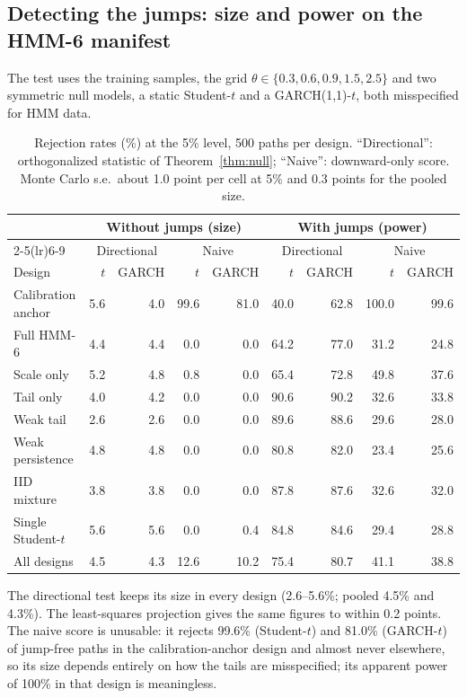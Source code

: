\documentclass[11pt,a4paper]{article}
\theoremstyle{definition}
\theoremstyle{remark}
\begin{document}
\subsection{Detecting the jumps: size and power on the HMM-6 manifest}\label{sec:full}
The test uses the training samples, the grid $\theta\in\{0.3,0.6,0.9,1.5,2.5\}$ and two symmetric null models, a static Student-$t$ and a GARCH(1,1)-$t$, both misspecified for HMM data.

\begin{table}[ht]\centering\footnotesize\setlength{\tabcolsep}{4pt}
\caption{Rejection rates (\%) at the 5\% level, 500 paths per design. ``Directional'': orthogonalized statistic of Theorem~\ref{thm:null}; ``Naive'': downward-only score. Monte Carlo s.e.\ about 1.0 point per cell at 5\% and 0.3 points for the pooled size.}\label{tab:full}
\begin{tabular}{l rr rr rr rr}
\toprule
 & \multicolumn{4}{c}{Without jumps (size)} & \multicolumn{4}{c}{With jumps (power)}\\
\cmidrule(lr){2-5}\cmidrule(lr){6-9}
 & \multicolumn{2}{c}{Directional} & \multicolumn{2}{c}{Naive} & \multicolumn{2}{c}{Directional} & \multicolumn{2}{c}{Naive}\\
Design & $t$ & GARCH & $t$ & GARCH & $t$ & GARCH & $t$ & GARCH\\
\midrule
Calibration anchor & 5.6 & 4.0 & 99.6 & 81.0 & 40.0 & 62.8 & 100.0 & 99.6\\
Full HMM-6 & 4.4 & 4.4 & 0.0 & 0.0 & 64.2 & 77.0 & 31.2 & 24.8\\
Scale only & 5.2 & 4.8 & 0.8 & 0.0 & 65.4 & 72.8 & 49.8 & 37.6\\
Tail only & 4.0 & 4.2 & 0.0 & 0.0 & 90.6 & 90.2 & 32.6 & 33.8\\
Weak tail & 2.6 & 2.6 & 0.0 & 0.0 & 89.6 & 88.6 & 29.6 & 28.0\\
Weak persistence & 4.8 & 4.8 & 0.0 & 0.0 & 80.8 & 82.0 & 23.4 & 25.6\\
IID mixture & 3.8 & 3.8 & 0.0 & 0.0 & 87.8 & 87.6 & 32.6 & 32.0\\
Single Student-$t$ & 5.6 & 5.6 & 0.0 & 0.4 & 84.8 & 84.6 & 29.4 & 28.8\\
\midrule
All designs & 4.5 & 4.3 & 12.6 & 10.2 & 75.4 & 80.7 & 41.1 & 38.8\\
\bottomrule
\end{tabular}
\end{table}

The directional test keeps its size in every design (2.6--5.6\%; pooled 4.5\% and 4.3\%). The least-squares projection gives the same figures to within 0.2 points. The naive score is unusable: it rejects 99.6\% (Student-$t$) and 81.0\% (GARCH-$t$) of jump-free paths in the calibration-anchor design and almost never elsewhere, so its size depends entirely on how the tails are misspecified; its apparent power of 100\% in that design is meaningless.
\end{document}
